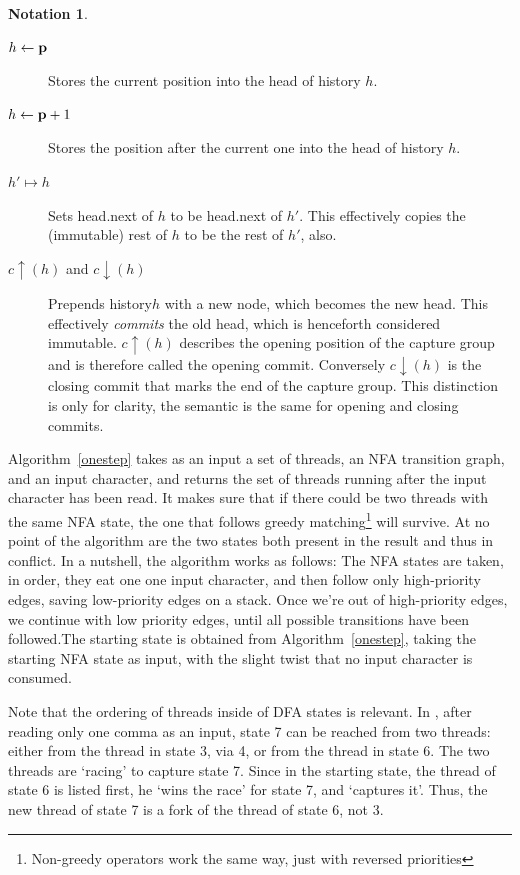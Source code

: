 \documentclass[english]{sigplanconf}
\theoremstyle{definition}
\newtheorem*{notation}{Notation}
\begin{document}
\begin{notation}
\begin{description}
\item [$h\leftarrow\mathbf{\mathbf{p}}$] Stores the current position into the head of history $h$.
\item [$h\leftarrow\mathbf{\mathbf{p}}+1$] Stores the position after the current one into the head of history $h$.
\item [$h'\mapsto h$] Sets head.next of $h$ to be head.next of $h'$. 
This effectively copies the (immutable) rest of $h$ to be the rest of $h'$, also. 
\item [$c\uparrow(h)$ and $c\downarrow(h)$] Prepends history$h$ with a new node, which becomes the new head.
This effectively \emph{commits} the old head, which is henceforth considered immutable. $c\uparrow(h)$ 
describes the opening position of the capture group and is therefore called the opening commit. 
Conversely $c\downarrow(h)$ is the closing commit that marks the end of the capture group. 
This distinction is only for clarity, the semantic is the same for opening and closing commits.
\end{description}

\end{notation}

Algorithm~\ref{onestep}  takes as an input a set of threads, an NFA
transition graph, and an input character, and returns the set of
threads running after the input character has been read. It makes
sure that if there could be two threads with the same NFA state,
the one that follows greedy matching\footnote{Non-greedy operators
work the same way, just with reversed priorities} will survive. At
no point of the algorithm are the two states both present in the
result and thus in conflict. In a nutshell, the algorithm works as
follows: The NFA states are taken, in order, they eat one one input
character, and then follow only high-priority edges, saving
low-priority edges on a stack.  Once we're out of high-priority
edges, we continue with low priority edges, until all possible
transitions have been followed.The starting state is obtained
from Algorithm~\ref{onestep}, taking the starting NFA state as input,
with the slight twist that no input character is consumed.

Note that the ordering of threads inside of DFA states is relevant.
In , after reading only one comma as an
input, state 7 can be reached from two threads: either from the
thread in state 3, via 4, or from the thread in state 6. The two
threads are `racing' to capture state 7. Since in the starting
state, the thread of state 6 is listed first, he `wins the race'
for state 7, and `captures it'. Thus, the new thread of state 7 is
a fork of the thread of state 6, not 3.
\end{document}

